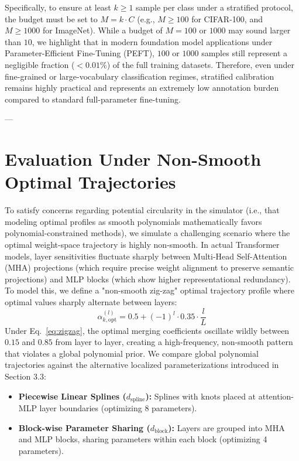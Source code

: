 Specifically, to ensure at least $k \ge 1$ sample per class under a stratified protocol, the budget must be set to $M = k \cdot C$ (e.g., $M \ge 100$ for CIFAR-100, and $M \ge 1000$ for ImageNet).
While a budget of $M = 100$ or $1000$ may sound larger than $10$, we highlight that in modern foundation model applications under Parameter-Efficient Fine-Tuning (PEFT), $100$ or $1000$ samples still represent a negligible fraction ($<0.01\%$) of the full training datasets.
Therefore, even under fine-grained or large-vocabulary classification regimes, stratified calibration remains highly practical and represents an extremely low annotation burden compared to standard full-parameter fine-tuning.

---

\section{Evaluation Under Non-Smooth Optimal Trajectories}
\label{app:non_smooth_priors}

To satisfy concerns regarding potential circularity in the simulator (i.e., that modeling optimal profiles as smooth polynomials mathematically favors polynomial-constrained methods), we simulate a challenging scenario where the optimal weight-space trajectory is highly non-smooth.
In actual Transformer models, layer sensitivities fluctuate sharply between Multi-Head Self-Attention (MHA) projections (which require precise weight alignment to preserve semantic projections) and MLP blocks (which show higher representational redundancy).
To model this, we define a "non-smooth zig-zag" optimal trajectory profile where optimal values sharply alternate between layers:
\begin{equation}
\label{eq:zigzag}
\alpha_{k, \text{opt}}^{(l)} = 0.5 + (-1)^l \cdot 0.35 \cdot \frac{l}{L}
\end{equation}
Under Eq.~\eqref{eq:zigzag}, the optimal merging coefficients oscillate wildly between $0.15$ and $0.85$ from layer to layer, creating a high-frequency, non-smooth pattern that violates a global polynomial prior.
We compare global polynomial trajectories against the alternative localized parameterizations introduced in Section 3.3:
\begin{itemize}
    \item \textbf{Piecewise Linear Splines ($d_{\text{spline}}$):} Splines with knots placed at attention-MLP layer boundaries (optimizing 8 parameters).
    \item \textbf{Block-wise Parameter Sharing ($d_{\text{block}}$):} Layers are grouped into MHA and MLP blocks, sharing parameters within each block (optimizing 4 parameters).
\end{itemize}

